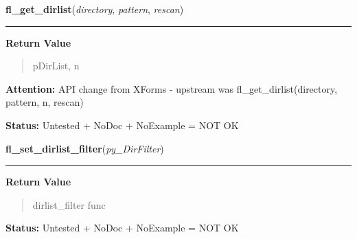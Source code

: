     \label{xformslib:library:fl_get_dirlist}

    \vspace{0.5ex}

\hspace{.8\funcindent}\begin{boxedminipage}{\funcwidth}

    \raggedright \textbf{fl\_get\_dirlist}(\textit{directory}, \textit{pattern}, \textit{rescan})

    \vspace{-1.5ex}

    \rule{\textwidth}{0.5\fboxrule}
\setlength{\parskip}{2ex}
\setlength{\parskip}{1ex}
      \textbf{Return Value}
    \vspace{-1ex}

      \begin{quote}
      pDirList, n

      \end{quote}

\textbf{Attention:} API change from XForms - upstream was fl\_get\_dirlist(directory, pattern, 
n, rescan)



\textbf{Status:} Untested + NoDoc + NoExample = NOT OK



    \end{boxedminipage}

    \label{xformslib:library:fl_set_dirlist_filter}

    \vspace{0.5ex}

\hspace{.8\funcindent}\begin{boxedminipage}{\funcwidth}

    \raggedright \textbf{fl\_set\_dirlist\_filter}(\textit{py\_DirFilter})

    \vspace{-1.5ex}

    \rule{\textwidth}{0.5\fboxrule}
\setlength{\parskip}{2ex}
\setlength{\parskip}{1ex}
      \textbf{Return Value}
    \vspace{-1ex}

      \begin{quote}
      dirlist\_filter func

      \end{quote}

\textbf{Status:} Untested + NoDoc + NoExample = NOT OK



    \end{boxedminipage}

